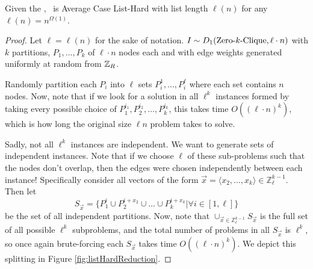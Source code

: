 \begin{theorem}
	Given the \strongzkc, \zkclique~is Average Case List-Hard with list length $\ell(n)$ for any $\ell(n) = n^{\Omega(1)}$.
	\label{thm:zkcAvgListHard}
\end{theorem}
\begin{proof}
	Let $\ell = \ell(n)$ for the sake of notation. $I \sim D_1(\mbox{Zero-$k$-Clique}, \ell \cdot n)$ with $k$ partitions, $P_1, \ldots, P_k$ of $\ell \cdot n$ nodes each and with edge weights generated uniformly at random from $\mathbb{Z}_R$.
	
	Randomly partition each $P_i$ into $\ell$ sets $P_i^1, \ldots, P_i^\ell$ where each set contains $n$ nodes. Now, note that if we look for a solution in all $\ell^k$ instances formed by taking every possible choice of $P_1^{i_1}, P_2^{i_2},\ldots, P_k^{i_k}$, this takes time $O((\ell\cdot  n)^k)$, which is how long the original size $\ell n$ problem takes to solve. 
	
	Sadly, not all $\ell^k$ instances are independent. We want to generate sets of independent instances. Note that if we choose $\ell$ of these sub-problems such that the nodes don't overlap, then the edges were chosen independently between each instance! Specifically consider all vectors of the form $\vec{x} = \langle x_2, \ldots, x_k\rangle \in \mathbb{Z}_{\ell}^{k-1}$. Then let 
	$$S_{\vec{x}}= \{P_1^i \cup P_2^{i+x_2} \cup \ldots \cup P_k^{i+x_k}|\forall i\in [1,\ell]\}$$
	be the set of all independent partitions. Now, note that $\cup_{\vec{x} \in \mathbb{Z}_\ell^{k-1}} S_{\vec{x}}$ is the full set of all possible $\ell^k$ subproblems, and the total number of problems in all $S_{\vec{x}}$ is $\ell^k$, so once again brute-forcing each $S_{\vec{x}}$ takes time $O((\ell \cdot n)^k)$. We depict this splitting in Figure \ref{fig:listHardReduction}.
	

\end{proof}
